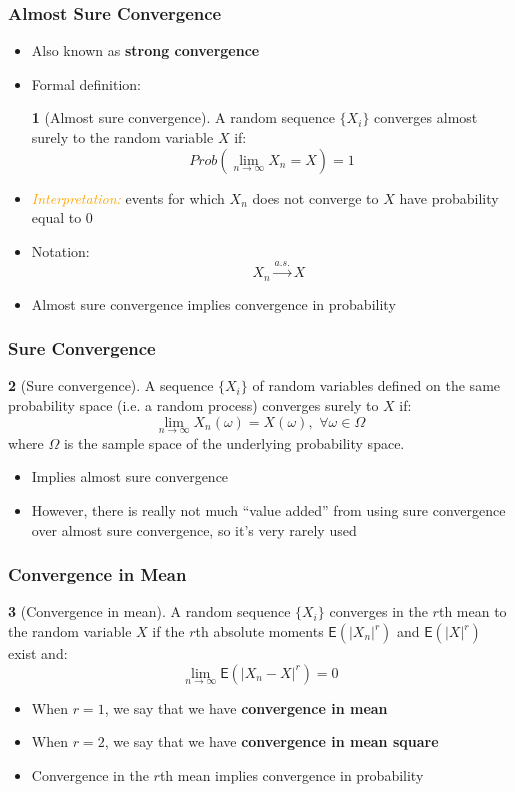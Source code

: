 \documentclass[10pt]{beamer}
\theoremstyle{definition}
\newtheorem{definition}{\translate{Definition}}
\begin{document}
\begin{frame}[fragile]
\frametitle{Almost Sure Convergence}
\begin{itemize}
	\item Also known as \textbf{strong convergence}
	\item Formal definition:
	\begin{definition}[Almost sure convergence]
		A random sequence $\{X_{i}\}$ converges almost surely to the random variable $X$ if:
		\[
			Prob(\lim_{n\to\infty} X_{n} = X) = 1
		\]
	\end{definition}
	\item \textcolor{orange}{\textit{Interpretation:}} events for which $X_{n}$ does not converge to $X$ have probability equal to 0
	\item Notation: 
	\[
		\quad X_{n} \overset{a.s.}{\to} X
	\]
	\item Almost sure convergence implies convergence in probability
\end{itemize}
\end{frame}

\begin{frame}[fragile]
\frametitle{Sure Convergence}
\begin{definition}[Sure convergence]
	A sequence $\{X_{i}\}$ of random variables defined on the same probability space (i.e. a random process) converges surely to $X$ if:
	\[
		\lim_{n\to\infty}X_n(\omega)=X(\omega), \, \, \forall \omega \in \Omega
	\]
	where $\Omega$ is the sample space of the underlying probability space.	
\end{definition}

\begin{itemize}
	\item Implies almost sure convergence
	\item However, there is really not much ``value added'' from using sure convergence over almost sure convergence, so it's very rarely used
\end{itemize}
\end{frame}

\begin{frame}[fragile]
\frametitle{Convergence in Mean}
\begin{definition}[Convergence in mean]
	A random sequence $\{X_{i}\}$ converges in the $r$th mean to the random variable $X$ if the $r$th absolute moments $\mathsf{E}(|X_{n}|^{r})$ and $\mathsf{E}(|X|^{r})$ exist and:
	\[
		\lim_{n\to\infty}\mathsf{E}(|X_n - X|^{r}) = 0
	\]
\end{definition}
\begin{itemize}
	\item When $r=1$, we say that we have \textbf{convergence in mean}
	\item When $r=2$, we say that we have \textbf{convergence in mean square}
	\item Convergence in the $r$th mean implies convergence in probability
\end{itemize}
\end{frame}
\end{document}

